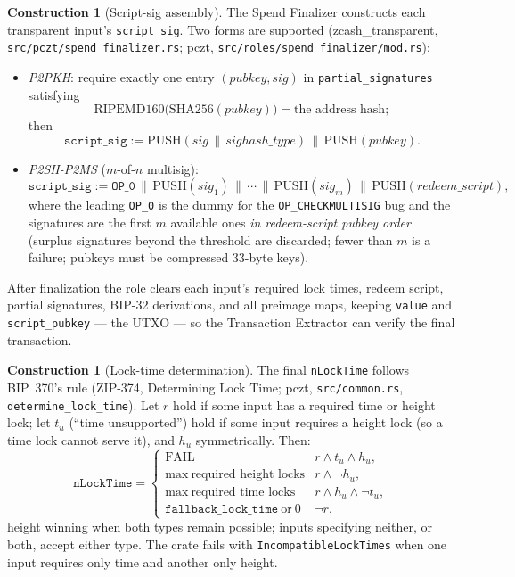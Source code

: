 \documentclass[11pt,a4paper]{article}
\theoremstyle{definition}
\newtheorem{construction}[theorem]{Construction}
\begin{document}
\begin{construction}[Script-sig assembly]\label{def:pczt-scriptsig}
The Spend Finalizer constructs each transparent input's
\texttt{script\_sig}. Two forms are supported
(\textsf{zcash\_transparent}, \texttt{src/pczt/spend\_finalizer.rs};
\textsf{pczt}, \texttt{src/roles/spend\_finalizer/mod.rs}):
\begin{itemize}
\item \emph{P2PKH}: require exactly one entry
  $(\mathit{pubkey}, \mathit{sig})$ in \texttt{partial\_signatures}
  satisfying
  \[
  \mathrm{RIPEMD160}\bigl(\mathrm{SHA256}(\mathit{pubkey})\bigr)
  = \text{the address hash};
  \]
  then
  \[
  \texttt{script\_sig} := \mathrm{PUSH}(\mathit{sig} \,\|\,
  \mathit{sighash\_type}) \,\|\, \mathrm{PUSH}(\mathit{pubkey}).
  \]
\item \emph{P2SH-P2MS} ($m$-of-$n$ multisig):
  \[
  \texttt{script\_sig} := \texttt{OP\_0} \,\|\,
  \mathrm{PUSH}(\mathit{sig}_1) \,\|\, \cdots \,\|\,
  \mathrm{PUSH}(\mathit{sig}_m)
  \,\|\, \mathrm{PUSH}(\mathit{redeem\_script}),
  \]
  where the leading
  \texttt{OP\_0} is the dummy for the \texttt{OP\_CHECKMULTISIG} bug and
  the signatures are the first $m$ available ones \emph{in redeem-script
  pubkey order} (surplus signatures beyond the threshold are discarded;
  fewer than $m$ is a failure; pubkeys must be compressed $33$-byte
  keys).
\end{itemize}
After finalization the role clears each input's required lock times,
redeem script, partial signatures, BIP-32 derivations, and all preimage
maps, keeping
\texttt{value} and \texttt{script\_pubkey} --- the UTXO --- so the
Transaction Extractor can verify the final transaction.
\end{construction}

\begin{construction}[Lock-time determination]\label{def:pczt-locktime}
The final \texttt{nLockTime} follows BIP~370's rule (ZIP-374, Determining
Lock Time; \textsf{pczt}, \texttt{src/common.rs},
\texttt{determine\_lock\_time}). Let $r$ hold if some
input has a required time or height lock; let $t_u$ (``time
unsupported'') hold if some input requires a height lock
(so a time lock cannot serve it), and $h_u$
symmetrically. Then:
\[
\texttt{nLockTime} =
\begin{cases}
\text{FAIL} & r \wedge t_u \wedge h_u, \\
\max\ \text{required height locks} & r \wedge \neg h_u, \\
\max\ \text{required time locks} & r \wedge h_u \wedge \neg t_u, \\
\texttt{fallback\_lock\_time}\ \text{or}\ 0 & \neg r,
\end{cases}
\]
height winning when both types remain possible; inputs specifying
neither, or both, accept either type. The crate fails with
\texttt{IncompatibleLockTimes} when one input requires only time and
another only height.
\end{construction}
\end{document}
